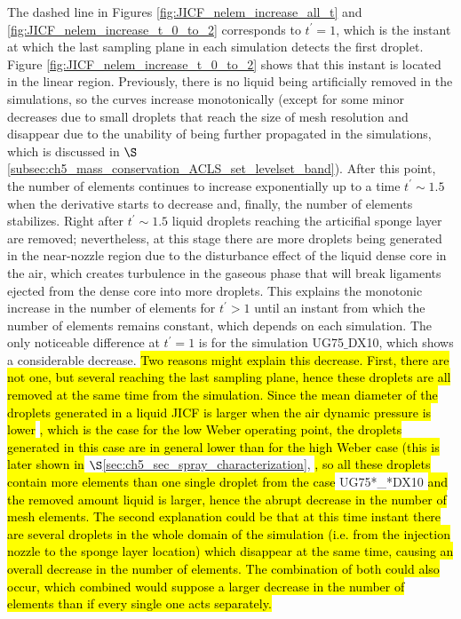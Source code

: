The dashed line in Figures \ref{fig:JICF_nelem_increase_all_t} and  \ref{fig:JICF_nelem_increase_t_0_to_2} corresponds  to $t^{\prime} = 1$, which is the instant at which the last sampling plane in each simulation detects the first droplet. Figure \ref{fig:JICF_nelem_increase_t_0_to_2} shows that this instant is located in the linear region. Previously, there is no liquid being artificially removed in the simulations, so the curves increase monotonically (except for some minor decreases due to small droplets that reach the size of mesh resolution and disappear due to the unability of being further propagated in the simulations, which is discussed in $\S$\ref{subsec:ch5_mass_conservation_ACLS_set_levelset_band}). After this point, the number of elements continues to increase exponentially up to a time $t^{\prime} \sim 1.5$ when the derivative starts to decrease and, finally, the number of elements  stabilizes. Right after $t^{\prime} \sim 1.5$ liquid droplets reaching the articifial sponge layer are removed; nevertheless, at this stage there are more droplets being generated in the near-nozzle region due to the disturbance effect of the liquid dense core in the air, which creates turbulence in the gaseous phase that will break ligaments ejected from the dense core into more droplets. This explains the monotonic increase in the number of elements for $t^{\prime} > 1$ until an instant from which the number of elements remains constant, which depends on each simulation. The only noticeable difference at $t^{\prime} = 1$ is for the simulation UG75$\_$DX10, which shows a considerable decrease. \hl{Two reasons might explain this decrease. First, there are not one, but several reaching the last sampling plane, hence these droplets are all removed at the same time from the simulation. Since the mean diameter of the droplets generated in a liquid JICF is larger when the air dynamic pressure is lower}  \hl{, which is the case for the low Weber operating point, the droplets generated in this case are in general lower than for the high Weber case (this is later shown in }$\S$\ref{sec:ch5_sec_spray_characterization}, \hl{, so all these droplets contain more elements than one single droplet from the case } UG75*\_*DX10 \hl{and the removed amount liquid is larger, hence the abrupt decrease in the number of mesh elements. The second explanation could be that at this time instant there are several droplets in the whole domain of the simulation (i.e. from the injection nozzle to the sponge layer location) which disappear at the same time, causing an overall decrease in the number of elements. The combination of both could also occur, which combined would suppose a larger decrease in the number of elements than if every single one acts separately.}

